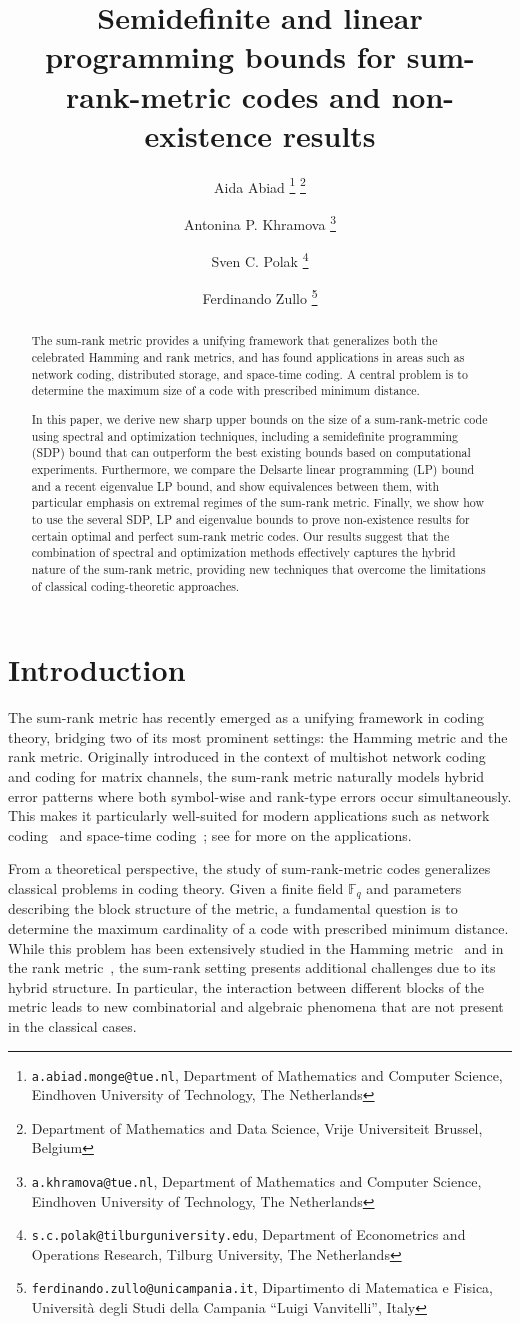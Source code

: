 \documentclass[a4paper]{article}
\title{Semidefinite and linear programming bounds for sum-rank-metric codes and non-existence results}
\author{
Aida Abiad
\thanks{\texttt{a.abiad.monge@tue.nl}, Department of Mathematics and Computer Science, Eindhoven University of Technology, The Netherlands}
\thanks{Department of Mathematics and Data Science, Vrije Universiteit Brussel, Belgium} 
\and
Antonina P. Khramova
\thanks{\texttt{a.khramova@tue.nl}, Department of Mathematics and Computer Science, Eindhoven University of Technology, The Netherlands} 
\and
Sven C. Polak
\thanks{\texttt{s.c.polak@tilburguniversity.edu},  Department of Econometrics and Operations Research, Tilburg University, The Netherlands} 
\and
Ferdinando Zullo
\thanks{\texttt{ferdinando.zullo@unicampania.it}, Dipartimento di Matematica e Fisica, Universit\`a degli Studi della Campania ``Luigi Vanvitelli'', Italy} 
}
\date{}
\begin{document}
\maketitle


\begin{abstract}
The sum-rank metric provides a unifying framework that generalizes both the celebrated Hamming and rank metrics, and has found applications in areas such as network coding, distributed storage, and space-time coding. A central problem is to determine the maximum size of a code with prescribed minimum distance.

In this paper, we derive new sharp upper bounds on the size of a sum-rank-metric code using spectral and optimization techniques, including a semidefinite programming (SDP) bound that can outperform the best existing bounds based on computational experiments. Furthermore, we compare the Delsarte linear programming (LP) bound and a recent eigenvalue LP bound, and show equivalences between them, with particular emphasis on extremal regimes of the sum-rank metric. Finally, we show how to use the several SDP, LP and eigenvalue bounds to prove non-existence results for certain optimal and perfect sum-rank metric codes. Our results suggest that the combination of spectral and optimization methods effectively captures the hybrid nature of the sum-rank metric, providing new techniques that overcome the limitations of classical coding-theoretic approaches.
\end{abstract}

\section{Introduction}

The sum-rank metric has recently emerged as a unifying framework in coding theory, bridging two of its most prominent settings: the Hamming metric and the rank metric. Originally introduced in the context of multishot network coding and coding for matrix channels, the sum-rank metric naturally models hybrid error patterns where both symbol-wise and rank-type errors occur simultaneously. This makes it particularly well-suited for modern applications such as network coding~\cite{silva2008rank,koetter2008coding} and space-time coding~\cite{yan2009error}; see \cite{martinez2022codes} for more on the applications. 

From a theoretical perspective, the study of sum-rank-metric codes generalizes classical problems in coding theory. Given a finite field $\mathbb{F}_q$ and parameters describing the block structure of the metric, a fundamental question is to determine the maximum cardinality of a code with prescribed minimum distance. While this problem has been extensively studied in the Hamming metric~\cite{macwilliams1977theory} and in the rank metric~\cite{D1978,gabidulin1985theory}, the sum-rank setting presents additional challenges due to its hybrid structure. In particular, the interaction between different blocks of the metric leads to new combinatorial and algebraic phenomena that are not present in the classical cases.
\end{document}
